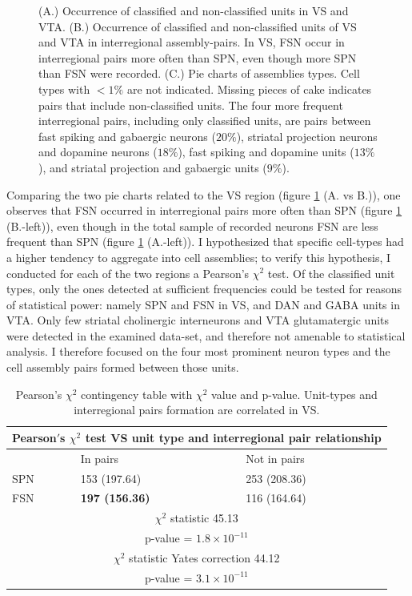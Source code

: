 \begin{figure}[H]
    \caption{(A.) Occurrence of classified and non-classified units in VS and VTA. (B.) Occurrence of classified and non-classified units of VS and VTA in interregional assembly-pairs. In VS, FSN occur in interregional pairs more often than SPN, even though more SPN than FSN were recorded. (C.) Pie charts of assemblies types. Cell types with $<1\%$ are not indicated. Missing pieces of cake indicates pairs that include non-classified units. The four more frequent interregional pairs, including only classified units, are pairs between fast spiking and gabaergic neurons ($20\%$), striatal projection neurons and dopamine neurons ($18\%$), fast spiking and dopamine units ($13\%$), and striatal projection and gabaergic units ($9\%$). }
    \label{fig:PieAssembliesTot}
\end{figure}
Comparing the two pie charts related to the VS region (figure \ref{fig:PieAssembliesTot} (A. vs B.)), one observes that FSN occurred in interregional pairs more often than SPN (figure \ref{fig:PieAssembliesTot} (B.-left)), even though in the total sample of recorded neurons FSN are less frequent than SPN (figure \ref{fig:PieAssembliesTot} (A.-left)).
\label{sec:CellTypesOcc}
I hypothesized that specific cell-types had a higher tendency to aggregate into cell assemblies; to verify this hypothesis, I conducted for each of the two regions a Pearson's $\chi^2$ test. Of the classified unit types, only the ones detected at sufficient frequencies could be tested for reasons of statistical power: namely SPN and FSN in VS, and DAN and GABA units in VTA. Only few striatal cholinergic interneurons and VTA glutamatergic units were detected in the examined data-set, and therefore not amenable to statistical analysis. I therefore focused on the four most prominent neuron types and the cell assembly pairs formed between those units.
\begin{table}[H]
\begin{tabular}{ |p{3cm}|p{3cm}|p{3cm}| }
 \hline
 \multicolumn{3}{|c|}{Pearson$'$s $\chi^2$ test VS unit type and interregional pair relationship} \\
 \hline
 & In pairs & Not in pairs\\
 \hline
 SPN & 153 (197.64) & 253 (208.36) \\
 \hline
 FSN & \textbf{197 (156.36)} & 116 (164.64)\\
 \hline
 \multicolumn{3}{|c|}{$\chi^2$ statistic  45.13}\\
 \multicolumn{3}{|c|}{p-value = $1.8\times10^{-11}$}\\
 \hline
 \multicolumn{3}{|c|}{$\chi^2$ statistic Yates correction 44.12}\\
 \multicolumn{3}{|c|}{p-value = $3.1\times10^{-11}$}\\
 \hline
\end{tabular}
\caption{Pearson's $\chi^2$ contingency table with $\chi^2$ value and p-value. Unit-types and interregional pairs formation are correlated in VS.}
\label{tab:chi2_asnotasVS}
\end{table}
